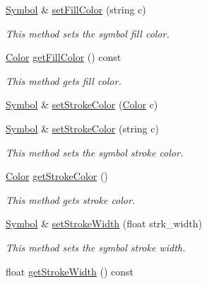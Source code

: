 \begin{DoxyCompactItemize}
\hyperlink{classbridges_1_1datastructure_1_1_symbol}{Symbol} \& \hyperlink{classbridges_1_1datastructure_1_1_symbol_abf6302892e46e7d2c1afaf21f0d57d6a}{set\+Fill\+Color} (string c)
\begin{DoxyCompactList}\small\item\em This method sets the symbol fill color. \end{DoxyCompactList}\item 
\hyperlink{classbridges_1_1datastructure_1_1_color}{Color} \hyperlink{classbridges_1_1datastructure_1_1_symbol_aa01f67739906515e00474c43f0ffc66e}{get\+Fill\+Color} () const
\begin{DoxyCompactList}\small\item\em This method gets fill color. \end{DoxyCompactList}\item 
\hyperlink{classbridges_1_1datastructure_1_1_symbol}{Symbol} \& \hyperlink{classbridges_1_1datastructure_1_1_symbol_a07b5f56354740a4c8d2b53aef638e4e6}{set\+Stroke\+Color} (\hyperlink{classbridges_1_1datastructure_1_1_color}{Color} c)
\item 
\hyperlink{classbridges_1_1datastructure_1_1_symbol}{Symbol} \& \hyperlink{classbridges_1_1datastructure_1_1_symbol_a6df1acb340b625fc5d480daaf220075d}{set\+Stroke\+Color} (string c)
\begin{DoxyCompactList}\small\item\em This method sets the symbol stroke color. \end{DoxyCompactList}\item 
\hyperlink{classbridges_1_1datastructure_1_1_color}{Color} \hyperlink{classbridges_1_1datastructure_1_1_symbol_aa99d36f97deaf99bee1d61778c85e87d}{get\+Stroke\+Color} ()
\begin{DoxyCompactList}\small\item\em This method gets stroke color. \end{DoxyCompactList}\item 
\hyperlink{classbridges_1_1datastructure_1_1_symbol}{Symbol} \& \hyperlink{classbridges_1_1datastructure_1_1_symbol_a7c888fae7333c7ed9edf9c33dae6ad8c}{set\+Stroke\+Width} (float strk\+\_\+width)
\begin{DoxyCompactList}\small\item\em This method sets the symbol stroke width. \end{DoxyCompactList}\item 
float \hyperlink{classbridges_1_1datastructure_1_1_symbol_a02d4f1567c23b054f74dd8f3d0555a32}{get\+Stroke\+Width} () const

\end{DoxyCompactItemize}
